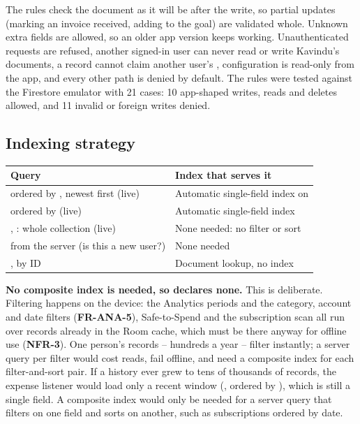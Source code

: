 \documentclass[11pt,a4paper]{article}
\newcommand{\req}[1]{\textsf{\textbf{\color{pfgreendark}#1}}}
\begin{document}
The rules check the document as it will be after the write, so partial updates (marking an invoice received, adding to the goal) are validated whole. Unknown extra fields are allowed, so an older app version keeps working. Unauthenticated requests are refused, another signed-in user can never read or write Kavindu's documents, a record cannot claim another user's , configuration is read-only from the app, and every other path is denied by default. The rules were tested against the Firestore emulator with 21 cases: 10 app-shaped writes, reads and deletes allowed, and 11 invalid or foreign writes denied.

\subsection{Indexing strategy}
\begin{tabularx}{\textwidth}{|>{\raggedright\arraybackslash}p{5.6cm}|L|}
\hline
\textbf{Query} & \textbf{Index that serves it}\\
\hline
{} ordered by , newest first (live) & Automatic single-field index on \\
 ordered by  (live) & Automatic single-field index\\
, : whole collection (live) & None needed: no filter or sort\\
  from the server (is this a new user?) & None needed\\
,  by ID & Document lookup, no index\\
\hline
\end{tabularx}

\textbf{No composite index is needed, so  declares none.} This is deliberate. Filtering happens on the device: the Analytics periods and the category, account and date filters (\req{FR-ANA-5}), Safe-to-Spend and the subscription scan all run over records already in the Room cache, which must be there anyway for offline use (\req{NFR-3}). One person's records -- hundreds a year -- filter instantly; a server query per filter would cost reads, fail offline, and need a composite index for each filter-and-sort pair. If a history ever grew to tens of thousands of records, the expense listener would load only a recent window (, ordered by ), which is still a single field. A composite index would only be needed for a server query that filters on one field and sorts on another, such as subscriptions ordered by date.
\end{document}
